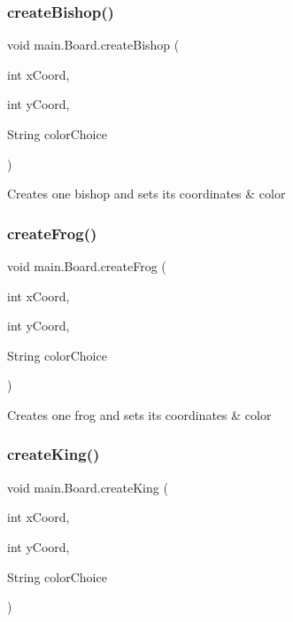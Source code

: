 \subsubsection{\texorpdfstring{create\+Bishop()}{createBishop()}}
{\footnotesize\ttfamily void main.\+Board.\+create\+Bishop (\begin{DoxyParamCaption}\item[{int}]{x\+Coord,  }\item[{int}]{y\+Coord,  }\item[{String}]{color\+Choice }\end{DoxyParamCaption})\hspace{0.3cm}{\ttfamily [inline]}}

Creates one bishop and sets its coordinates \& color \mbox{\label{classmain_1_1_board_a10f8b1925189e9c3e818f3555d7ebd39}} 
\subsubsection{\texorpdfstring{create\+Frog()}{createFrog()}}
{\footnotesize\ttfamily void main.\+Board.\+create\+Frog (\begin{DoxyParamCaption}\item[{int}]{x\+Coord,  }\item[{int}]{y\+Coord,  }\item[{String}]{color\+Choice }\end{DoxyParamCaption})\hspace{0.3cm}{\ttfamily [inline]}}

Creates one frog and sets its coordinates \& color \mbox{\label{classmain_1_1_board_a1d2ea2f8563f577b2f0fabcf855738c1}} 
\subsubsection{\texorpdfstring{create\+King()}{createKing()}}
{\footnotesize\ttfamily void main.\+Board.\+create\+King (\begin{DoxyParamCaption}\item[{int}]{x\+Coord,  }\item[{int}]{y\+Coord,  }\item[{String}]{color\+Choice }\end{DoxyParamCaption})\hspace{0.3cm}{\ttfamily [inline]}}

